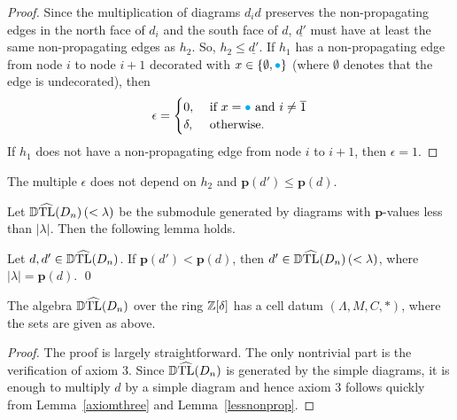 \begin{proof}
Since the multiplication of diagrams $d_id$ preserves the non-propagating edges in the north face of $d_i$ and the south face of $d$, $\underline{d'}$ must have at least the same non-propagating edges as $h_2$. So,  $h_2\leq\underline{d'}$. 
If $h_1$ has a non-propagating edge from node $i$ to node $i+1$ decorated with $x\in\{\emptyset,{\color{cyan}\bullet}\}$ (where $\emptyset$ denotes that the edge is undecorated), then
\[
\epsilon=\begin{cases} 0, &\mbox{ if }x={\color{cyan}\bullet} \mbox{ and }i\neq\overline{1}\\ \delta, &\mbox{ otherwise.}\end{cases}
\]
If $h_1$ does not have a non-propagating edge from node $i$ to $i+1$, then $\epsilon=1$.%
\end{proof}

\begin{remark}
The multiple $\epsilon$ does not depend on $h_2$ and $\mathbf{p}(d')\leq\mathbf{p}(d)$.
\end{remark}

Let $\operatorname{\mathbb{D}\widehat{TL}}(D_n)\left(<\lambda\right)$ be the submodule generated by diagrams with $\mathbf{p}$-values less than $|\lambda|$. Then the following lemma holds.

\begin{lemma}\label{lessnonprop}
Let $d,d'\in\operatorname{\mathbb{D}\widehat{TL}}(D_n)$. If $\mathbf{p}(d')<\mathbf{p}(d)$, then $d'\in \operatorname{\mathbb{D}\widehat{TL}}(D_n)\left(<\lambda\right)$, where $|\lambda|=\mathbf{p}(d)$.
\qed
\end{lemma}


\begin{theorem}\label{loopfreecellular}
The algebra $\operatorname{\mathbb{D}\widehat{TL}}(D_n)$ over the ring $\mathbb{Z}[\delta]$ has a cell datum $(\Lambda,M,C,*)$, where the sets are given as above.
\end{theorem}

\begin{proof}
The proof is largely straightforward. The only nontrivial part is the verification of axiom 3. Since $\operatorname{\mathbb{D}\widehat{TL}}(D_n)$ is generated by the simple diagrams, it is enough to multiply $d$ by a simple diagram and hence axiom 3 follows quickly from Lemma~\ref{axiomthree} and Lemma~\ref{lessnonprop}.
\end{proof}

